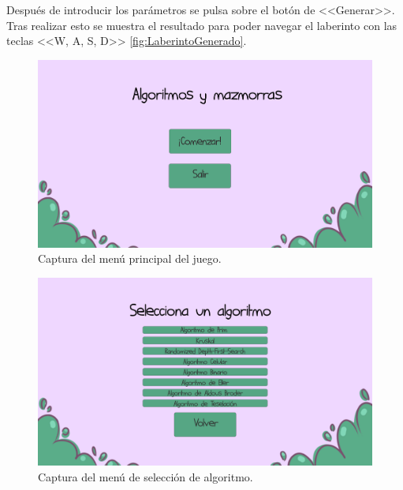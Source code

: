 Después de introducir los parámetros se pulsa sobre el botón de <<Generar>>. Tras realizar esto se muestra el resultado para poder navegar el laberinto con las teclas <<W, A, S, D>> \ref{fig:LaberintoGenerado}.


\begin{figure}[!h]  
    \centering  
    \includegraphics[width=\textwidth]{img/MenuPrincipal.png}  
    \caption{Captura del menú principal del juego.}  
    \label{fig:MenuPrincipal}
\end{figure}

\begin{figure}[!h]  
    \centering  
    \includegraphics[width=\textwidth]{img/MenuSeleccion.png}  
    \caption{Captura del menú de selección de algoritmo.}  
    \label{fig:MenuSeleccion}
\end{figure}

